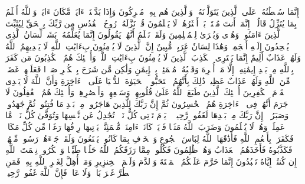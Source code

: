 \startbuffer[\q:16:100]
إِنَّمَا سُلۡطَٰنُهُۥ عَلَى ٱلَّذِینَ یَتَوَلَّوۡنَهُۥ وَٱلَّذِینَ هُم بِهِۦ مُشۡرِكُونَ%
\stopbuffer
\startbuffer[\q:16:101]
وَإِذَا بَدَّلۡنَاۤ ءَایَةࣰ مَّكَانَ ءَایَةࣲ وَٱللَّهُ أَعۡلَمُ بِمَا یُنَزِّلُ قَالُوۤا۟ إِنَّمَاۤ أَنتَ مُفۡتَرِۭۚ بَلۡ أَكۡثَرُهُمۡ لَا یَعۡلَمُونَ%
\stopbuffer
\startbuffer[\q:16:102]
قُلۡ نَزَّلَهُۥ رُوحُ ٱلۡقُدُسِ مِن رَّبِّكَ بِٱلۡحَقِّ لِیُثَبِّتَ ٱلَّذِینَ ءَامَنُوا۟ وَهُدࣰى وَبُشۡرَىٰ لِلۡمُسۡلِمِینَ%
\stopbuffer
\startbuffer[\q:16:103]
وَلَقَدۡ نَعۡلَمُ أَنَّهُمۡ یَقُولُونَ إِنَّمَا یُعَلِّمُهُۥ بَشَرࣱۗ لِّسَانُ ٱلَّذِی یُلۡحِدُونَ إِلَیۡهِ أَعۡجَمِیࣱّ وَهَٰذَا لِسَانٌ عَرَبِیࣱّ مُّبِینٌ%
\stopbuffer
\startbuffer[\q:16:104]
إِنَّ ٱلَّذِینَ لَا یُؤۡمِنُونَ بِءَایَٰتِ ٱللَّهِ لَا یَهۡدِیهِمُ ٱللَّهُ وَلَهُمۡ عَذَابٌ أَلِیمٌ%
\stopbuffer
\startbuffer[\q:16:105]
إِنَّمَا یَفۡتَرِی ٱلۡكَذِبَ ٱلَّذِینَ لَا یُؤۡمِنُونَ بِءَایَٰتِ ٱللَّهِۖ وَأُو۟لَٰۤئِكَ هُمُ ٱلۡكَٰذِبُونَ%
\stopbuffer
\startbuffer[\q:16:106]
مَن كَفَرَ بِٱللَّهِ مِنۢ بَعۡدِ إِیمَٰنِهِۦۤ إِلَّا مَنۡ أُكۡرِهَ وَقَلۡبُهُۥ مُطۡمَئِنُّۢ بِٱلۡإِیمَٰنِ وَلَٰكِن مَّن شَرَحَ بِٱلۡكُفۡرِ صَدۡرࣰا فَعَلَیۡهِمۡ غَضَبࣱ مِّنَ ٱللَّهِ وَلَهُمۡ عَذَابٌ عَظِیمࣱ%
\stopbuffer
\startbuffer[\q:16:107]
ذَٰلِكَ بِأَنَّهُمُ ٱسۡتَحَبُّوا۟ ٱلۡحَیَوٰةَ ٱلدُّنۡیَا عَلَى ٱلۡءَاخِرَةِ وَأَنَّ ٱللَّهَ لَا یَهۡدِی ٱلۡقَوۡمَ ٱلۡكَٰفِرِینَ%
\stopbuffer
\startbuffer[\q:16:108]
أُو۟لَٰۤئِكَ ٱلَّذِینَ طَبَعَ ٱللَّهُ عَلَىٰ قُلُوبِهِمۡ وَسَمۡعِهِمۡ وَأَبۡصَٰرِهِمۡۖ وَأُو۟لَٰۤئِكَ هُمُ ٱلۡغَٰفِلُونَ%
\stopbuffer
\startbuffer[\q:16:109]
لَا جَرَمَ أَنَّهُمۡ فِی ٱلۡءَاخِرَةِ هُمُ ٱلۡخَٰسِرُونَ%
\stopbuffer
\startbuffer[\q:16:110]
ثُمَّ إِنَّ رَبَّكَ لِلَّذِینَ هَاجَرُوا۟ مِنۢ بَعۡدِ مَا فُتِنُوا۟ ثُمَّ جَٰهَدُوا۟ وَصَبَرُوۤا۟ إِنَّ رَبَّكَ مِنۢ بَعۡدِهَا لَغَفُورࣱ رَّحِیمࣱ%
\stopbuffer
\startbuffer[\q:16:111]
۞ یَوۡمَ تَأۡتِی كُلُّ نَفۡسࣲ تُجَٰدِلُ عَن نَّفۡسِهَا وَتُوَفَّىٰ كُلُّ نَفۡسࣲ مَّا عَمِلَتۡ وَهُمۡ لَا یُظۡلَمُونَ%
\stopbuffer
\startbuffer[\q:16:112]
وَضَرَبَ ٱللَّهُ مَثَلࣰا قَرۡیَةࣰ كَانَتۡ ءَامِنَةࣰ مُّطۡمَئِنَّةࣰ یَأۡتِیهَا رِزۡقُهَا رَغَدࣰا مِّن كُلِّ مَكَانࣲ فَكَفَرَتۡ بِأَنۡعُمِ ٱللَّهِ فَأَذَٰقَهَا ٱللَّهُ لِبَاسَ ٱلۡجُوعِ وَٱلۡخَوۡفِ بِمَا كَانُوا۟ یَصۡنَعُونَ%
\stopbuffer
\startbuffer[\q:16:113]
وَلَقَدۡ جَاۤءَهُمۡ رَسُولࣱ مِّنۡهُمۡ فَكَذَّبُوهُ فَأَخَذَهُمُ ٱلۡعَذَابُ وَهُمۡ ظَٰلِمُونَ%
\stopbuffer
\startbuffer[\q:16:114]
فَكُلُوا۟ مِمَّا رَزَقَكُمُ ٱللَّهُ حَلَٰلࣰا طَیِّبࣰا وَٱشۡكُرُوا۟ نِعۡمَتَ ٱللَّهِ إِن كُنتُمۡ إِیَّاهُ تَعۡبُدُونَ%
\stopbuffer
\startbuffer[\q:16:115]
إِنَّمَا حَرَّمَ عَلَیۡكُمُ ٱلۡمَیۡتَةَ وَٱلدَّمَ وَلَحۡمَ ٱلۡخِنزِیرِ وَمَاۤ أُهِلَّ لِغَیۡرِ ٱللَّهِ بِهِۦۖ فَمَنِ ٱضۡطُرَّ غَیۡرَ بَاغࣲ وَلَا عَادࣲ فَإِنَّ ٱللَّهَ غَفُورࣱ رَّحِیمࣱ%
